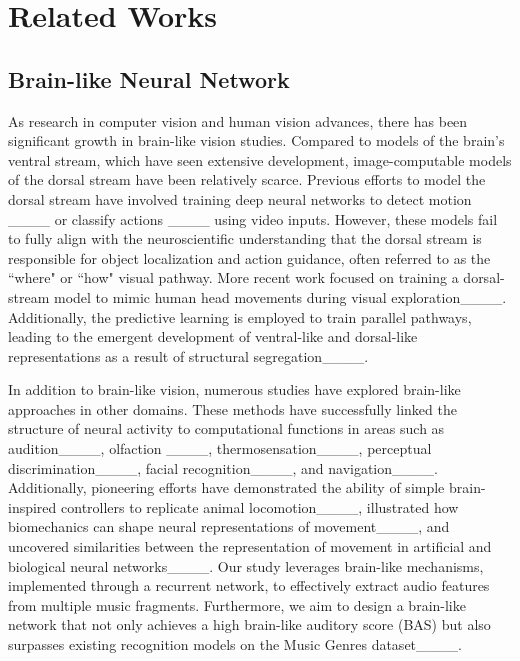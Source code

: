 \section{Related Works}
\subsection{Brain-like Neural Network}\par

As research in computer vision and human vision advances, there has been significant growth in brain-like vision studies. 
Compared to models of the brain’s ventral stream, which have seen extensive development, image-computable models of the dorsal stream have been relatively scarce. 
Previous efforts to model the dorsal stream have involved training deep neural networks to detect motion ____ or classify actions ____ using video inputs. 
However, these models fail to fully align with the neuroscientific understanding that the dorsal stream is responsible for object localization and action guidance, often referred to as the ``where" or ``how" visual pathway. 
More recent work focused on training a dorsal-stream model to mimic human head movements during visual exploration____. 
Additionally, the predictive learning is employed to train parallel pathways, leading to the emergent development of ventral-like and dorsal-like representations as a result of structural segregation____.


In addition to brain-like vision, numerous studies have explored brain-like approaches in other domains. 
These methods have successfully linked the structure of neural activity to computational functions in areas such as audition____, olfaction ____, thermosensation____, perceptual discrimination____, facial recognition____, and navigation____. 
Additionally, pioneering efforts have demonstrated the ability of simple brain-inspired controllers to replicate animal locomotion____, illustrated how biomechanics can shape neural representations of movement____, and uncovered similarities between the representation of movement in artificial and biological neural networks____. 
Our study leverages brain-like mechanisms, implemented through a recurrent network, to effectively extract audio features from multiple music fragments. 
Furthermore, we aim to design a brain-like network that not only achieves a high brain-like auditory score (BAS) but also surpasses existing recognition models on the Music Genres dataset____.

